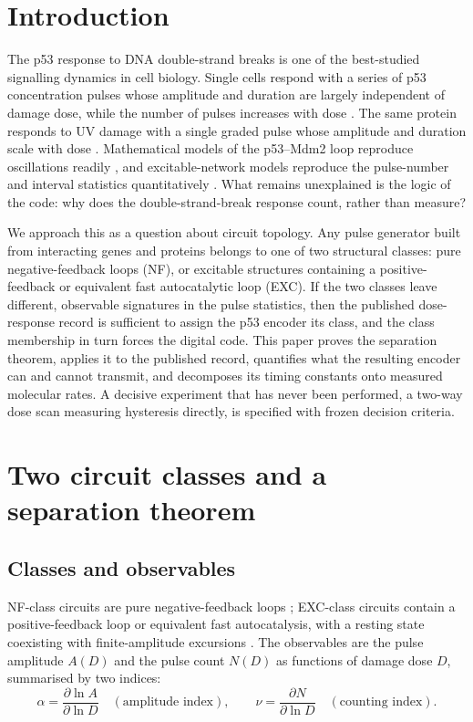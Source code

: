 \documentclass[11pt,a4paper]{article}
\begin{document}
\section{Introduction}

The p53 response to DNA double-strand breaks is one of the best-studied signalling dynamics in cell biology. Single cells respond with a series of p53 concentration pulses whose amplitude and duration are largely independent of damage dose, while the number of pulses increases with dose \cite{Lahav2004,GevaZatorsky2006,Batchelor2008,Loewer2013}. The same protein responds to UV damage with a single graded pulse whose amplitude and duration scale with dose \cite{Batchelor2011}. Mathematical models of the p53--Mdm2 loop reproduce oscillations readily \cite{BarOr2000,Monk2003,Ciliberto2005,Chickarmane2007}, and excitable-network models reproduce the pulse-number and interval statistics quantitatively \cite{Monke2017}. What remains unexplained is the logic of the code: why does the double-strand-break response count, rather than measure?

We approach this as a question about circuit topology. Any pulse generator built from interacting genes and proteins belongs to one of two structural classes: pure negative-feedback loops (NF), or excitable structures containing a positive-feedback or equivalent fast autocatalytic loop (EXC). If the two classes leave different, observable signatures in the pulse statistics, then the published dose-response record is sufficient to assign the p53 encoder its class, and the class membership in turn forces the digital code. This paper proves the separation theorem, applies it to the published record, quantifies what the resulting encoder can and cannot transmit, and decomposes its timing constants onto measured molecular rates. A decisive experiment that has never been performed, a two-way dose scan measuring hysteresis directly, is specified with frozen decision criteria.

\section{Two circuit classes and a separation theorem}
\label{sec:theorem}

\subsection{Classes and observables}

NF-class circuits are pure negative-feedback loops \cite{BarOr2000,Monk2003,GevaZatorsky2006}; EXC-class circuits contain a positive-feedback loop or equivalent fast autocatalysis, with a resting state coexisting with finite-amplitude excursions \cite{Ciliberto2005,Monke2017}. The observables are the pulse amplitude $A(D)$ and the pulse count $N(D)$ as functions of damage dose $D$, summarised by two indices:
\begin{equation}
\alpha=\frac{\partial\ln A}{\partial\ln D}\quad(\text{amplitude index}),
\qquad
\nu=\frac{\partial N}{\partial\ln D}\quad(\text{counting index}).
\label{eq:indices}
\end{equation}
\end{document}
